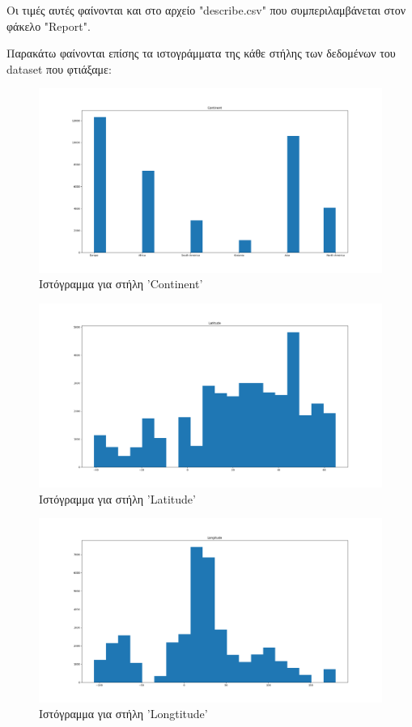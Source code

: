 \documentclass[12pt,a4paper]{article}
\begin{document}
Οι τιμές αυτές φαίνονται και στο αρχείο "describe.csv" που συμπεριλαμβάνεται στον φάκελο "Report".

Παρακάτω φαίνονται επίσης τα ιστογράμματα της κάθε στήλης των δεδομένων του dataset που φτιάξαμε:

\begin{figure}[H]
	\includegraphics[width=\textwidth]{Figures/Question1/1. Histogram for Continent.png}
	\caption{Ιστόγραμμα για στήλη 'Continent'}
\end{figure}

\begin{figure}[H]
	\includegraphics[width=\textwidth]{Figures/Question1/2. Histogram for Latitude.png}
	\caption{Ιστόγραμμα για στήλη 'Latitude'}
\end{figure}

\begin{figure}[H]
	\includegraphics[width=\textwidth]{Figures/Question1/3. Histogram for Longtitude.png}
	\caption{Ιστόγραμμα για στήλη 'Longtitude'}
\end{figure}
\end{document}
